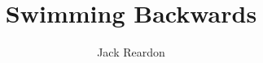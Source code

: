 \documentclass{scrbook}
\author{Jack Reardon}
\title{Swimming Backwards}
\date{}
\begin{document}
\maketitle

% 

\tableofcontents
\titlemark


\end{document}
